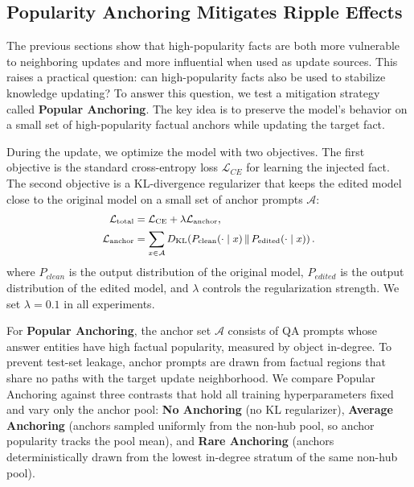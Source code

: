 \FloatBarrier

\subsection{Popularity Anchoring Mitigates Ripple Effects}
\label{subsec:mitigation}

The previous sections show that high-popularity facts are both more vulnerable to neighboring updates and more influential when used as update sources. This raises a practical question: can high-popularity facts also be used to stabilize knowledge updating? To answer this question, we test a mitigation strategy called \textbf{Popular Anchoring}. The key idea is to preserve the model's behavior on a small set of high-popularity factual anchors while updating the target fact.

During the update, we optimize the model with two objectives. The first objective is the standard cross-entropy loss $\mathcal{L}_{CE}$ for learning the injected fact. The second objective is a KL-divergence regularizer that keeps the edited model close to the original model on a small set of anchor prompts $\mathcal{A}$:
\begin{equation}
\small
\begin{aligned}
\mathcal{L}_{\mathrm{total}}
&= \mathcal{L}_{\mathrm{CE}} + \lambda \mathcal{L}_{\mathrm{anchor}}, \\
\mathcal{L}_{\mathrm{anchor}}
&= \sum_{x \in \mathcal{A}}
D_{\mathrm{KL}}\!\left(
P_{\mathrm{clean}}(\cdot \mid x)
\,\|\, 
P_{\mathrm{edited}}(\cdot \mid x)
\right).
\end{aligned}
\end{equation}
where $P_{clean}$ is the output distribution of the original model, $P_{edited}$ is the output distribution of the edited model, and $\lambda$ controls the regularization strength. We set $\lambda=0.1$ in all experiments.

For \textbf{Popular Anchoring}, the anchor set $\mathcal{A}$ consists of QA prompts whose answer entities have high factual popularity, measured by object in-degree. To prevent test-set leakage, anchor prompts are drawn from factual regions that share no paths with the target update neighborhood. We compare Popular Anchoring against three contrasts that hold all training hyperparameters fixed and vary only the anchor pool: \textbf{No Anchoring} (no KL regularizer), \textbf{Average Anchoring} (anchors sampled uniformly from the non-hub pool, so anchor popularity tracks the pool mean), and \textbf{Rare Anchoring} (anchors deterministically drawn from the lowest in-degree stratum of the same non-hub pool).


